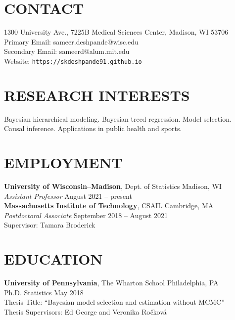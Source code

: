 \documentclass[margin]{res}
\begin{document}
  
                        
\begin{resume}                        
  
  \section{CONTACT} 
  1300 University Ave., 7225B Medical Sciences Center, Madison, WI 53706 \\
  Primary Email: sameer.deshpande@wisc.edu \\
  Secondary Email: sameerd@alum.mit.edu \\
  Website: \texttt{https://skdeshpande91.github.io}

  \section{RESEARCH INTERESTS}
  Bayesian hierarchical modeling. Bayesian treed regression. Model selection. Causal inference. Applications in public health and sports. 
              
\section{EMPLOYMENT} 

\textbf{University of Wisconsin--Madison}, Dept. of Statistics \hfill Madison, WI \\
\textit{Assistant Professor} \hfill August 2021 -- present \\

\textbf{Massachusetts Institute of Technology}, CSAIL \hfill Cambridge, MA \\
\emph{Postdoctoral Associate} \hfill September 2018 -- August 2021 \\
Supervisor: Tamara Broderick
              
\section{EDUCATION}      
                {\bf University of Pennsylvania}, The Wharton School \hfill Philadelphia, PA \\
                Ph.D. Statistics \hfill May 2018 \\
		Thesis Title: ``Bayesian model selection and estimation without MCMC'' \\
		Thesis Supervisors: Ed George and Veronika Ro\v{c}kov\'{a}
                

\end{resume}
\end{document}
